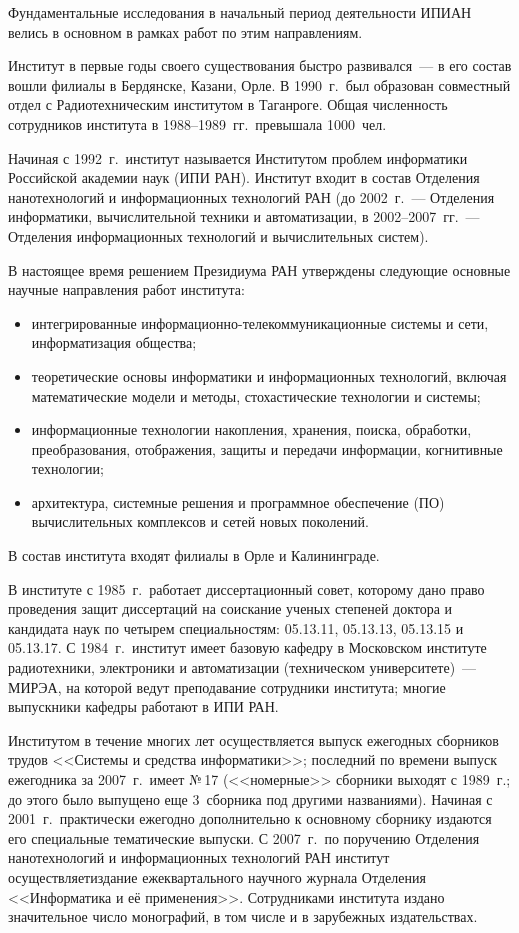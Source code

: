 \begin{multicols}{2}
     Фундаментальные исследования в начальный период
деятельности ИПИАН велись в основном в рамках работ по этим
направлениям.

     Институт в первые годы своего существования быстро
развивался~--- в его состав вошли филиалы в Бердянске, Казани,
Орле. В 1990~г.\ был образован совместный отдел с
Радиотехническим институтом в Таганроге. Общая численность
сотрудников института в 1988--1989~гг.\ превышала 1000~чел.

     Начиная с 1992~г.\ институт называется Институтом проблем
информатики Российской академии наук (ИПИ РАН). Институт
входит в состав Отделения нанотехнологий и информационных
технологий РАН (до 2002~г.~--- Отделения информатики,
вычислительной техники и автоматизации, в 2002--2007~гг.~---
Отделения информационных технологий и вычислительных систем).

     В настоящее время решением Президиума РАН утверждены
следующие основные научные на\-прав\-ле\-ния работ института:
     \begin{itemize}
\item интегрированные информационно-те\-ле\-ком\-му\-ни\-ка\-ционные системы и сети, информатизация
общества;
\item теоретические основы информатики и информационных
технологий, включая математические модели и методы,
стохастические технологии и системы;
\item информационные технологии накопления, хранения,
поиска, обработки, преобразования, отображения, защиты и
передачи информации, когнитивные технологии;
\item архитектура, системные решения и про\-грам\-мное
обеспечение (ПО) вычислительных комплексов и сетей новых
поколений.
\end{itemize}

     В состав института входят филиалы в Орле и Калининграде.

     В институте с 1985~г.\ работает диссертационный совет,
которому дано право проведения защит диссертаций на соискание
ученых степеней доктора и кандидата наук по четырем
специальностям: 05.13.11, 05.13.13, 05.13.15 и 05.13.17. С 1984~г.\
институт имеет базовую кафедру в Московском институте
радиотехники, электроники и автоматизации (техническом
университете)~--- МИРЭА, на которой ведут преподавание
сотрудники института; многие выпускники кафедры работают в
ИПИ РАН.
{

}

     Институтом в течение многих лет осуществляется выпуск
ежегодных сборников трудов <<Системы и средства
информатики>>; последний по времени выпуск ежегодника за
2007~г.\ имеет №\,17 (<<номерные>> сборники выходят с 1989~г.;
до этого было выпущено еще 3~сборника под другими названиями).
Начиная с 2001~г.\ практически ежегодно до\-пол\-нитель\-но к
основному сборнику издаются его специальные тематические
выпуски. С 2007~г.\ по поручению Отделения нанотехнологий и
информационных технологий РАН институт осуществляет\linebreak издание
ежеквартального научного журнала Отделения <<Информатика и её
применения>>. Сотрудниками института издано значительное число
монографий, в том числе и в зарубежных издательствах.


\end{multicols}
